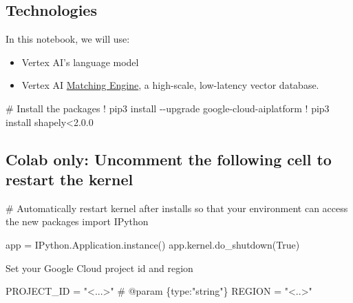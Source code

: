 \documentclass[
  letterpaper,
  DIV=11,
  numbers=noendperiod]{scrreprt}
\newenvironment{Shaded}{\begin{snugshade}}{\end{snugshade}}
\newcommand{\CommentTok}[1]{\textcolor[rgb]{0.37,0.37,0.37}{#1}}
\newcommand{\FloatTok}[1]{\textcolor[rgb]{0.68,0.00,0.00}{#1}}
\newcommand{\ImportTok}[1]{\textcolor[rgb]{0.00,0.46,0.62}{#1}}
\newcommand{\NormalTok}[1]{\textcolor[rgb]{0.00,0.23,0.31}{#1}}
\newcommand{\OperatorTok}[1]{\textcolor[rgb]{0.37,0.37,0.37}{#1}}
\newcommand{\StringTok}[1]{\textcolor[rgb]{0.13,0.47,0.30}{#1}}
\newcommand{\VariableTok}[1]{\textcolor[rgb]{0.07,0.07,0.07}{#1}}
\begin{document}
\hypertarget{technologies}{%
\subsection{Technologies}\label{technologies}}

In this notebook, we will use:

\begin{itemize}
\item
  Vertex AI's language model
\item
  Vertex AI
  \href{https://cloud.google.com/vertex-ai/docs/matching-engine/overview}{Matching
  Engine}, a high-scale, low-latency vector database.
\end{itemize}

\begin{Shaded}
\begin{Highlighting}[]
\CommentTok{\# Install the packages}
\OperatorTok{!}\NormalTok{ pip3 install }\OperatorTok{{-}{-}}\NormalTok{upgrade google}\OperatorTok{{-}}\NormalTok{cloud}\OperatorTok{{-}}\NormalTok{aiplatform}
\OperatorTok{!}\NormalTok{ pip3 install shapely}\OperatorTok{\textless{}}\FloatTok{2.0.0}
\end{Highlighting}
\end{Shaded}

\hypertarget{colab-only-uncomment-the-following-cell-to-restart-the-kernel}{%
\subsection{Colab only: Uncomment the following cell to restart the
kernel}\label{colab-only-uncomment-the-following-cell-to-restart-the-kernel}}

\begin{Shaded}
\begin{Highlighting}[]
\CommentTok{\# Automatically restart kernel after installs so that your environment can access the new packages}
\ImportTok{import}\NormalTok{ IPython}

\NormalTok{app }\OperatorTok{=}\NormalTok{ IPython.Application.instance()}
\NormalTok{app.kernel.do\_shutdown(}\VariableTok{True}\NormalTok{)}
\end{Highlighting}
\end{Shaded}

Set your Google Cloud project id and region

\begin{Shaded}
\begin{Highlighting}[]
\NormalTok{PROJECT\_ID }\OperatorTok{=} \StringTok{"\textless{}...\textgreater{}"}  \CommentTok{\# @param \{type:"string"\}}
\NormalTok{REGION }\OperatorTok{=} \StringTok{"\textless{}..\textgreater{}"}
\end{Highlighting}
\end{Shaded}
\end{document}
